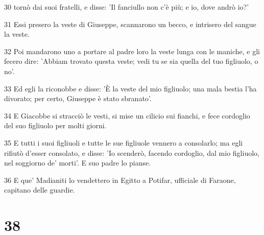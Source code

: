 \par 30 tornò dai suoi fratelli, e disse: 'Il fanciullo non c'è più; e io, dove andrò io?'
\par 31 Essi presero la veste di Giuseppe, scannarono un becco, e intrisero del sangue la veste.
\par 32 Poi mandarono uno a portare al padre loro la veste lunga con le maniche, e gli fecero dire: 'Abbiam trovato questa veste; vedi tu se sia quella del tuo figliuolo, o no'.
\par 33 Ed egli la riconobbe e disse: 'È la veste del mio figliuolo; una mala bestia l'ha divorato; per certo, Giuseppe è stato sbranato'.
\par 34 E Giacobbe si stracciò le vesti, si mise un cilicio sui fianchi, e fece cordoglio del suo figliuolo per molti giorni.
\par 35 E tutti i suoi figliuoli e tutte le sue figliuole vennero a consolarlo; ma egli rifiutò d'esser consolato, e disse: 'Io scenderò, facendo cordoglio, dal mio figliuolo, nel soggiorno de' morti'. E suo padre lo pianse.
\par 36 E que' Madianiti lo vendettero in Egitto a Potifar, ufficiale di Faraone, capitano delle guardie.

\chapter{38}

